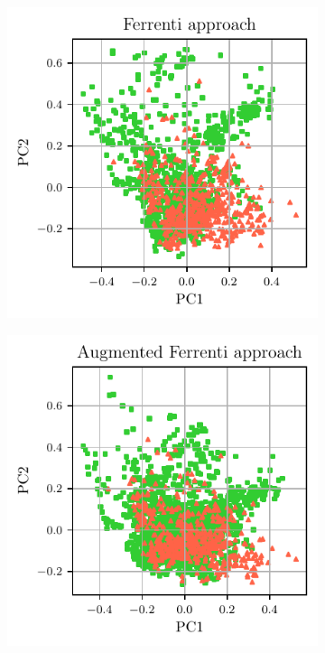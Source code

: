 \documentclass[superscriptaddress,unsortedaddress,
 amsmath,amssymb,
 aps,
]{revtex4-2}
\begin{document}
\begin{figure}[h] %
    \centering
    \begin{subfigure}{0.3\textwidth}
        \centering
        \includegraphics[width=1\textwidth]{figures/pca-2d-plots/01-ferrenti-approach.pdf}
    \end{subfigure}%
    \begin{subfigure}{0.3\textwidth}
        \centering
        \includegraphics[width=1\textwidth]{figures/pca-2d-plots/02-augmented-ferrenti-approach.pdf}

\end{subfigure}
\end{figure}
\end{document}
